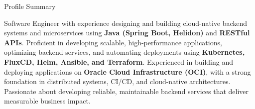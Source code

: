 \documentclass{resume}
\begin{document}
\begin{rSection}{Profile Summary}

Software Engineer with experience designing and building cloud-native backend systems and microservices using \textbf{Java (Spring Boot, Helidon)} and \textbf{RESTful APIs}. Proficient in developing scalable, high-performance applications, optimizing backend services, and automating deployments using \textbf{Kubernetes, FluxCD, Helm, Ansible, and Terraform}. Experienced in building and deploying applications on \textbf{Oracle Cloud Infrastructure (OCI)}, with a strong foundation in distributed systems, CI/CD, and cloud-native architectures. Passionate about developing reliable, maintainable backend services that deliver measurable business impact.

\end{rSection}
\end{document}
